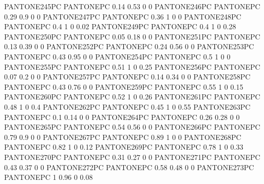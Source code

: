  {PANTONE245PC} {PANTONE\SpotSpace PC} {0.14 0.53 0 0}
 {PANTONE246PC} {PANTONE\SpotSpace PC} {0.29 0.9 0 0}
 {PANTONE247PC} {PANTONE\SpotSpace PC} {0.36 1 0 0}
 {PANTONE248PC} {PANTONE\SpotSpace PC} {0.4 1 0 0.02}
 {PANTONE249PC} {PANTONE\SpotSpace PC} {0.4 1 0 0.28}
 {PANTONE250PC} {PANTONE\SpotSpace PC} {0.05 0.18 0 0}
 {PANTONE251PC} {PANTONE\SpotSpace PC} {0.13 0.39 0 0}
 {PANTONE252PC} {PANTONE\SpotSpace PC} {0.24 0.56 0 0}
 {PANTONE253PC} {PANTONE\SpotSpace PC} {0.43 0.95 0 0}
 {PANTONE254PC} {PANTONE\SpotSpace PC} {0.5 1 0 0}
 {PANTONE255PC} {PANTONE\SpotSpace PC} {0.51 1 0 0.25}
 {PANTONE256PC} {PANTONE\SpotSpace PC} {0.07 0.2 0 0}
 {PANTONE257PC} {PANTONE\SpotSpace PC} {0.14 0.34 0 0}
 {PANTONE258PC} {PANTONE\SpotSpace PC} {0.43 0.76 0 0}
 {PANTONE259PC} {PANTONE\SpotSpace PC} {0.55 1 0 0.15}
 {PANTONE260PC} {PANTONE\SpotSpace PC} {0.52 1 0 0.26}
 {PANTONE261PC} {PANTONE\SpotSpace PC} {0.48 1 0 0.4}
 {PANTONE262PC} {PANTONE\SpotSpace PC} {0.45 1 0 0.55}
 {PANTONE263PC} {PANTONE\SpotSpace PC} {0.1 0.14 0 0}
 {PANTONE264PC} {PANTONE\SpotSpace PC} {0.26 0.28 0 0}
 {PANTONE265PC} {PANTONE\SpotSpace PC} {0.54 0.56 0 0}
 {PANTONE266PC} {PANTONE\SpotSpace PC} {0.79 0.9 0 0}
 {PANTONE267PC} {PANTONE\SpotSpace PC} {0.89 1 0 0}
 {PANTONE268PC} {PANTONE\SpotSpace PC} {0.82 1 0 0.12}
 {PANTONE269PC} {PANTONE\SpotSpace PC} {0.78 1 0 0.33}
 {PANTONE270PC} {PANTONE\SpotSpace PC} {0.31 0.27 0 0}
 {PANTONE271PC} {PANTONE\SpotSpace PC} {0.43 0.37 0 0}
 {PANTONE272PC} {PANTONE\SpotSpace PC} {0.58 0.48 0 0}
 {PANTONE273PC} {PANTONE\SpotSpace PC} {1 0.96 0 0.08}
